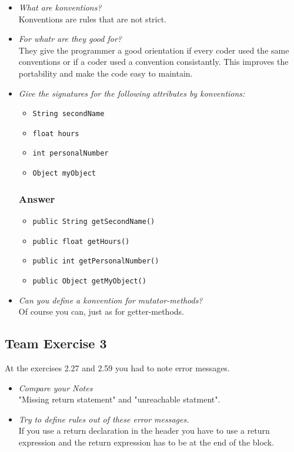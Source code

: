\begin{itemize}
	\item \textit{What are konventions?} \\
		Konventions are rules that are not strict.
	\item \textit{For whatr are they good for?} \\
		They give the programmer a good orientation if every
		coder used the same conventions or if a coder used a
		convention consistantly. This improves the portability
		and make the code easy to maintain.
	\item \textit{Give the signatures for the following attributes
		by konventions:}
		\begin{itemize}
			\item \lstinline{String secondName}
			\item \lstinline{float hours}
			\item \lstinline{int personalNumber}
			\item \lstinline{Object myObject}
		\end{itemize}
	\subsubsection*{Answer}
		\begin{itemize}
			\item \lstinline{public String getSecondName()}
			\item \lstinline{public float getHours()}
			\item \lstinline{public int getPersonalNumber()}
			\item \lstinline{public Object getMyObject()}
		\end{itemize}
	\item \textit{Can you define a konvention for mutator-methods?} \\
		Of course you can, just as for getter-methods.
\end{itemize}

\subsection{Team Exercise 3}
At the exercises 2.27 and 2.59 you had to note error messages.
\begin{itemize}
	\item \textit{Compare your Notes} \\
		"Missing return statement" and "unreachable statment".
	\item \textit{Try to define rules out of these error messages.} \\
		If you use a return declaration in the header you have to
		use a return expression and the return expression has to
		be at the end of the block.
\end{itemize}

